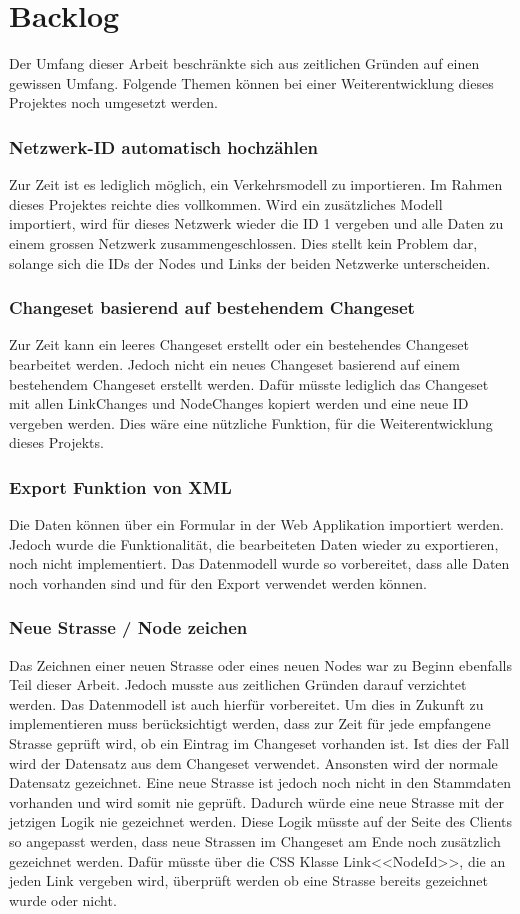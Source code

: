 \section{Backlog}
Der Umfang dieser Arbeit beschränkte sich aus zeitlichen Gründen auf einen gewissen Umfang. Folgende Themen können bei einer Weiterentwicklung dieses Projektes noch umgesetzt werden.
\subsubsection*{Netzwerk-ID automatisch hochzählen}
Zur Zeit ist es lediglich möglich, ein Verkehrsmodell zu importieren. Im Rahmen dieses Projektes reichte dies vollkommen. Wird ein zusätzliches Modell importiert, wird für dieses Netzwerk wieder die ID 1 vergeben und alle Daten zu einem grossen Netzwerk zusammengeschlossen. Dies stellt kein Problem dar, solange sich die IDs der Nodes und Links der beiden Netzwerke unterscheiden.
\subsubsection*{Changeset basierend auf bestehendem Changeset}
Zur Zeit kann ein leeres Changeset erstellt oder ein bestehendes Changeset bearbeitet werden. Jedoch nicht ein neues Changeset basierend auf einem bestehendem Changeset erstellt werden. Dafür müsste lediglich das Changeset mit allen Link\textunderscore Changes und Node\textunderscore Changes kopiert werden und eine neue ID vergeben werden. Dies wäre eine nützliche Funktion, für die Weiterentwicklung dieses Projekts.
\subsubsection*{Export Funktion von XML}
Die Daten können über ein Formular in der Web Applikation importiert werden. Jedoch wurde die Funktionalität, die bearbeiteten Daten wieder zu exportieren, noch nicht implementiert. Das Datenmodell wurde so vorbereitet, dass alle Daten noch vorhanden sind und für den Export verwendet werden können.
\subsubsection*{Neue Strasse / Node zeichen}
Das Zeichnen einer neuen Strasse oder eines neuen Nodes war zu Beginn ebenfalls Teil dieser Arbeit. Jedoch musste aus zeitlichen Gründen darauf verzichtet werden. Das Datenmodell ist auch hierfür vorbereitet. Um dies in Zukunft zu implementieren muss berücksichtigt werden, dass zur Zeit für jede empfangene Strasse geprüft wird, ob ein Eintrag im Changeset vorhanden ist. Ist dies der Fall wird der Datensatz aus dem Changeset verwendet. Ansonsten wird der normale Datensatz gezeichnet. Eine neue Strasse ist jedoch noch nicht in den Stammdaten vorhanden und wird somit nie geprüft. Dadurch würde eine neue Strasse mit der jetzigen Logik nie gezeichnet werden. Diese Logik müsste auf der Seite des Clients so angepasst werden, dass neue Strassen im Changeset am Ende noch zusätzlich gezeichnet werden. Dafür müsste über die CSS Klasse \glqq{}Link\textunderscore <<NodeId>>\grqq{}, die an jeden Link vergeben wird,  überprüft werden ob eine Strasse bereits gezeichnet wurde oder nicht.
